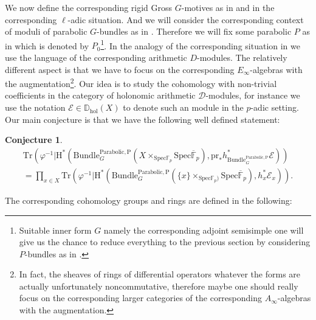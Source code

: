 \documentclass[11pt]{book}
\newtheorem{conjecture}[theorem]{Conjecture}
\theoremstyle{definition}
\numberwithin{equation}{section}
\begin{document}
\indent We now define the corresponding rigid Gross $G$-motives as in \cite{Gro1} and \cite{GL1} in the corresponding $\ell$-adic situation. And we will consider the corresponding context of moduli of parabolic $G$-bundles as in \cite[Section 5.5.1]{GL1}. Therefore we will fix some parabolic $P$ as in \cite[Section 5.5.1]{GL1} which is denoted by $P_0$\footnote{Suitable inner form $G$ namely the corresponding adjoint semisimple one will give us the chance to reduce everything to the previous section by considering $P$-bundles as in \cite[Example 5.5.1.8]{GL1}.}. In the analogy of the corresponding situation in \cite{GL1} we use the language of the corresponding arithmetic $D$-modules. The relatively different aspect is that we have to focus on the corresponding $E_\infty$-algebras with the augmentation\footnote{In fact, the sheaves of rings of differential operators whatever the forms are actually unfortunately noncommutative, therefore maybe one should really focus on the corresponding larger categories of the corresponding $A_\infty$-algebras with the augmentation.}. Our idea is to study the cohomology with non-trivial coefficients in the category of holonomic arithmetic $\mathcal{D}$-modules, for instance we use the notation $\mathcal{E}\in \mathbb{D}_{\mathrm{hol}}(X)$ to denote such an module in the $p$-adic setting. Our main conjecture is that we have the following well defined statement:

\begin{conjecture}
\begin{align}
\mathrm{Tr}(\varphi^{-1}|\mathrm{H}^*(\mathrm{Bundle}^\mathrm{Parabolic,P}_G(X\times_{\mathrm{Spec}\mathbb{F}_p} \mathrm{Spec}\overline{\mathbb{F}}_p),\mathrm{pr}_*h_{\mathrm{Bundle}^\mathrm{Parabolic,P}_G}^*\mathcal{E}))\\
=\prod_{x\in X} \mathrm{Tr}(\varphi^{-1}|\mathrm{H}^*(\mathrm{Bundle}^\mathrm{Parabolic,P}_G(\{x\}\times_{\mathrm{Spec}\mathbb{F}_p)} \mathrm{Spec}\overline{\mathbb{F}}_p),h_x^*{\mathcal{E}}_x)).	
\end{align}
\end{conjecture}

The corresponding cohomology groups and rings are defined in the following:
\end{document}
